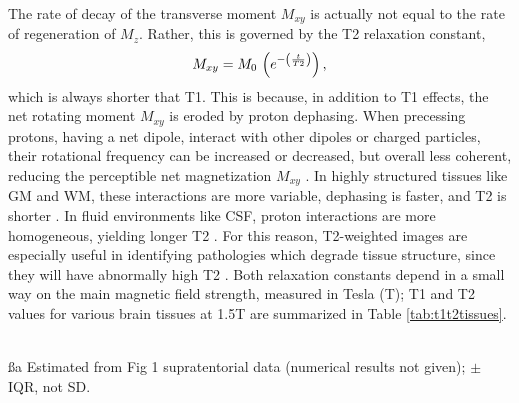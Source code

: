 \par
The rate of decay of the transverse moment $M_{xy}$ is actually not equal to the rate of regeneration of $M_z$. Rather, this is governed by the T2 relaxation constant,
\begin{equation}
M_{xy} = M_0\thinspace\left(e^{-\left(\frac{t}{T2}\right)}\right)\label{eq:T2},
\end{equation}
which is always shorter that T1. This is because, in addition to T1 effects, the net rotating moment $M_{xy}$ is eroded by proton dephasing. When precessing protons, having a net dipole, interact with other dipoles or charged particles, their rotational frequency can be increased or decreased, but overall less coherent, reducing the perceptible net magnetization $M_{xy}$ \cite{Bloch1946}. In highly structured tissues like GM and WM, these interactions are more variable, dephasing is faster, and T2 is shorter \cite{Roberts2007}. In fluid environments like CSF, proton interactions are more homogeneous, yielding longer T2 \cite{Roberts2007}. For this reason, T2-weighted images are especially useful in identifying pathologies which degrade tissue structure, since they will have abnormally high T2 \cite{Roberts2007}. Both relaxation constants depend in a small way on the main magnetic field strength, measured in Tesla (T); T1 and T2 values for various brain tissues at 1.5T are summarized in Table \ref{tab:t1t2tissues}.
\par
\begin{table}
  \caption{T1 and T2 constants for brain tissues at 1.5 Tesla.}
  \label{tab:t1t2tissues}
  \\[0.5em]
  \footnotesize{\ss{a} Estimated from Fig 1 supratentorial data (numerical results not given); $\pm$ IQR, not SD.}
\end{table}

